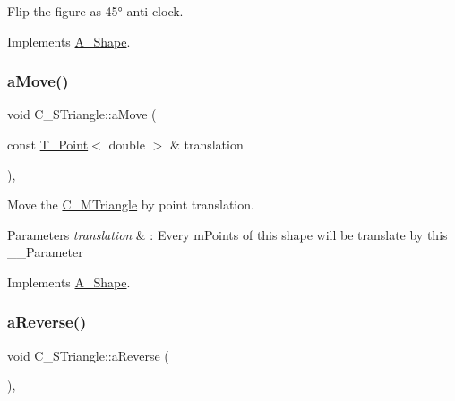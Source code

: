 Flip the figure as 45° anti clock. 



Implements \hyperlink{classA__Shape_abe947e7003cb63be2b4f6c439533427d}{A\+\_\+\+Shape}.

\mbox{\label{classC__STriangle_a82a3c3a847ca6c2d5922921150fa50b5}} 
\subsubsection{\texorpdfstring{a\+Move()}{aMove()}}
{\footnotesize\ttfamily void C\+\_\+\+S\+Triangle\+::a\+Move (\begin{DoxyParamCaption}\item[{const \hyperlink{classT__Point}{T\+\_\+\+Point}$<$ double $>$ \&}]{translation }\end{DoxyParamCaption})\hspace{0.3cm}{\ttfamily [override]}, {\ttfamily [virtual]}}



Move the \hyperlink{classC__MTriangle}{C\+\_\+\+M\+Triangle} by point translation. 


\begin{DoxyParams}{Parameters}
{\em translation} & \+: Every m\+Points of this shape will be translate by this \+\_\+\+\_\+\+Parameter \\
\hline
\end{DoxyParams}


Implements \hyperlink{classA__Shape_ab284298db1b557ccfa7ba6de7a5fee2c}{A\+\_\+\+Shape}.

\mbox{\label{classC__STriangle_a5402899ec4ea0de3ca3e7aa6f184a1c7}} 
\subsubsection{\texorpdfstring{a\+Reverse()}{aReverse()}}
{\footnotesize\ttfamily void C\+\_\+\+S\+Triangle\+::a\+Reverse (\begin{DoxyParamCaption}{ }\end{DoxyParamCaption})\hspace{0.3cm}{\ttfamily [override]}, {\ttfamily [virtual]}}



